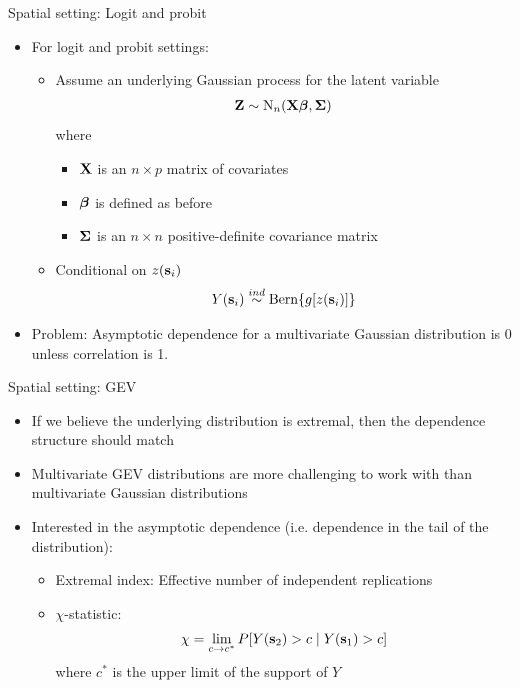 \documentclass{beamer}
\begin{document}
\begin{frame}{Spatial setting: Logit and probit}
\begin{itemize} \setlength{\itemsep}{1em}
  \item For logit and probit settings:
  \begin{itemize} \setlength{\itemsep}{0.5em}
    \item Assume an underlying Gaussian process for the latent variable
    \begin{align*}
      \mbox{\bf Z} \sim \text{N}_n(\mbox{\bf X} \mbox{\boldmath $\beta$}, \mbox{\boldmath $\Sigma$})
    \end{align*}
    where
    \begin{itemize} \setlength{\itemsep}{0.25em}
      \item $\mbox{\bf X}$ is an $n \times p$ matrix of covariates
      \item $\mbox{\boldmath $\beta$}$ is defined as before
      \item $\mbox{\boldmath $\Sigma$}$ is an $n \times n$ positive-definite covariance matrix
    \end{itemize}
    \item Conditional on $z(\mbox{\bf s}_i)$
    \begin{align*}
      Y(\mbox{\bf s}_i) \stackrel{ind}{\sim} \text{Bern} \{g[z(\mbox{\bf s}_i)]\}
    \end{align*}
  \end{itemize}
  \item \alert{Problem}: Asymptotic dependence for a multivariate Gaussian distribution is 0 unless correlation is 1.
\end{itemize}
\end{frame}

\begin{frame}{Spatial setting: GEV}
\begin{itemize} \setlength{\itemsep}{1em}
  \item If we believe the underlying distribution is extremal, then the dependence structure should match
  \item Multivariate GEV distributions are more challenging to work with than multivariate Gaussian distributions
  \item Interested in the \alert{asymptotic dependence} (i.e. dependence in the tail of the distribution):
  \begin{itemize} \setlength{\itemsep}{0.5em}
    \item Extremal index: Effective number of independent replications
    \item $\chi$-statistic:
    \begin{align*}
      \chi = \lim_{c \rightarrow c^*} P[Y(\mbox{\bf s}_2) > c \mid Y(\mbox{\bf s}_1) > c]
    \end{align*}
    where $c^*$ is the upper limit of the support of $Y$
  \end{itemize}
\end{itemize}
\end{frame}
\end{document}
